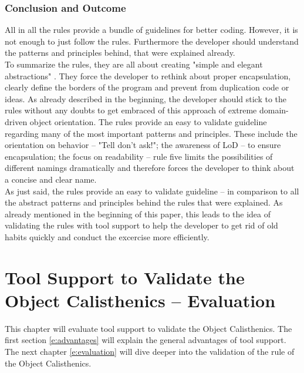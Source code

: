 \subsection*{Conclusion and Outcome}
All in all the rules provide a bundle of guidelines for better coding. However, it is not enough to just follow the rules. Furthermore the developer should understand the patterns and principles behind, that were explained already. 
\\

To summarize the rules, they are all about creating "simple and elegant abstractions" \cite[p. 80]{oc2008}. They force the developer to rethink about proper encapsulation, clearly define the borders of the program and prevent from duplication code or ideas. As already described in the beginning, the developer should stick to the rules without any doubts to get embraced of this approach of extreme domain-driven object orientation. The rules provide an easy to validate guideline regarding many of the most important patterns and principles. These include the orientation on behavior -- "Tell don't ask!"; the awareness of \ac{LoD} -- to ensure encapsulation; the focus on readability -- rule five limits the possibilities of different namings dramatically and therefore forces the developer to think about a concise and clear name. 
\\

As just said, the rules provide an easy to validate guideline -- in comparison to all the abstract patterns and principles behind the rules that were explained. As already mentioned in the beginning of this paper, this leads to the idea of validating the rules with tool support to help the developer to get rid of old habits quickly and conduct the excercise more efficiently. 





























\chapter{Tool Support to Validate the Object Calisthenics -- Evaluation}
\label{Evaluation}
This chapter will evaluate tool support to validate the Object Calisthenics. The first section \ref{e:advantages} will explain the general advantages of tool support. The next chapter \ref{e:evaluation} will dive deeper into the validation of the rule of the Object Calisthenics.

